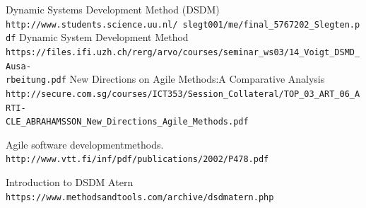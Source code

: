 \documentclass[12pt,a4paper]{article}
\begin{document}
\begin{thebibliography}{9}

 Dynamic Systems Development Method (DSDM)
\\\texttt{http://www.students.science.uu.nl/~slegt001/me/final\_5767202\_Slegten.pdf}
Dynamic System Development Method
\\\texttt{https://files.ifi.uzh.ch/rerg/arvo/courses/seminar\_ws03/14\_Voigt\_DSMD\_Ausa-\\rbeitung.pdf}
New Directions on Agile Methods:A Comparative Analysis
\\\texttt{http://secure.com.sg/courses/ICT353/Session\_Collateral/TOP\_03\_ART\_06\_ARTI-\\CLE\_ABRAHAMSSON\_New\_Directions\_Agile\_Methods.pdf}

Agile software developmentmethods.
\\\texttt{http://www.vtt.fi/inf/pdf/publications/2002/P478.pdf}


Introduction to DSDM Atern
\\\texttt{https://www.methodsandtools.com/archive/dsdmatern.php}
\end{thebibliography}
\end{document}
